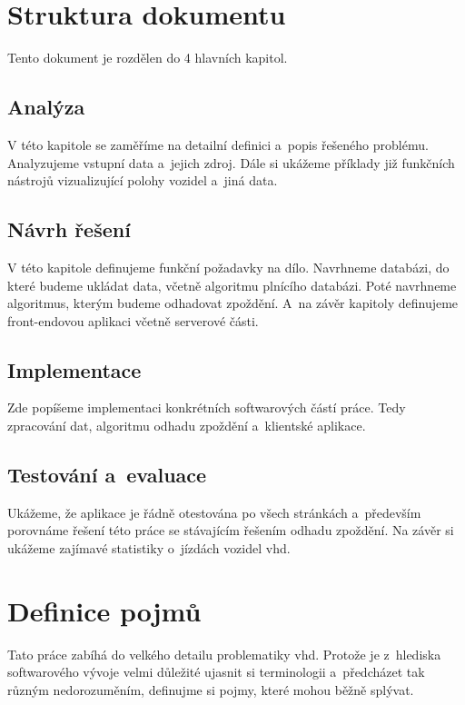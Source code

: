 \section*{Struktura dokumentu}

Tento dokument je rozdělen do 4 hlavních kapitol.

\subsection*{Analýza}

V této kapitole se zaměříme na detailní definici a~popis řešeného problému. Analyzujeme vstupní data a~jejich zdroj. Dále si ukážeme příklady již funkčních nástrojů vizualizující polohy vozidel a~jiná data.

\subsection*{Návrh řešení}

V této kapitole definujeme funkční požadavky na dílo. Navrhneme databázi, do které budeme ukládat data, včetně algoritmu plnícího databázi. Poté navrhneme algoritmus, kterým budeme odhadovat zpoždění. A~na závěr kapitoly definujeme front-endovou aplikaci včetně serverové části.

\subsection*{Implementace}

Zde popíšeme implementaci konkrétních softwarových částí práce. Tedy zpracování dat, algoritmu odhadu zpoždění a~klientské aplikace.

\subsection*{Testování a~evaluace}

Ukážeme, že aplikace je řádně otestována po všech stránkách a~především porovnáme řešení této práce se stávajícím řešením odhadu zpoždění. Na závěr si ukážeme zajímavé statistiky o~jízdách vozidel \gls{vhd}.

\section*{Definice pojmů}

Tato práce zabíhá do velkého detailu problematiky \gls{vhd}. Protože je z~hlediska softwarového vývoje velmi důležité ujasnit si terminologii a~předcházet tak různým nedorozuměním, definujme si pojmy, které mohou běžně splývat.

